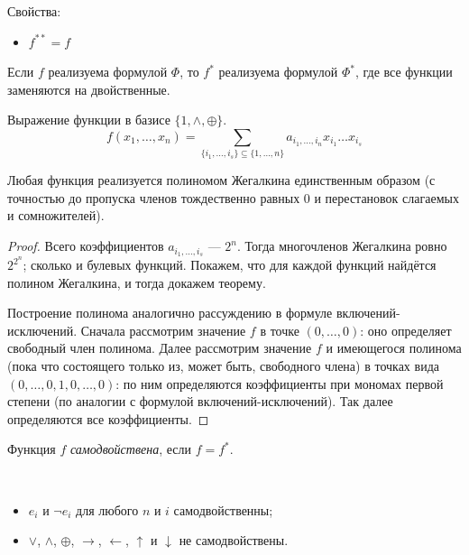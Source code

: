 \documentclass[12pt,a4paper]{article}
\begin{document}
    Свойства:
    \begin{itemize}
        \item $f^{**} = f$
    \end{itemize}

    \begin{statement}
        Если $f$ реализуема формулой $\Phi$, то $f^*$ реализуема формулой $\Phi^*$, где все функции заменяются на двойственные.
    \end{statement}

    \begin{definition}
        Выражение функции в базисе $\{1, \wedge, \oplus\}$.
        \[
            f(x_1, \dots, x_n) = \sum_{\{i_1, \dots, i_s\}\subseteq\{1, \dots, n\}} a_{i_1, \dots, i_n} x_{i_1} \dots x_{i_s}
        \]
    \end{definition}

    \begin{theorem}[Жегалкин]
        Любая функция реализуется полиномом Жегалкина единственным образом (с точностью до пропуска членов тождественно равных 0 и перестановок слагаемых и сомножителей). 
    \end{theorem}

    \begin{proof}
        Всего коэффициентов $a_{i_1, \dots, i_s}$ --- $2^n$. Тогда многочленов Жегалкина ровно $2^{2^n}$; сколько и булевых функций. Покажем, что для каждой функций найдётся полином Жегалкина, и тогда докажем теорему.

        Построение полинома аналогично рассуждению в формуле включений-исключений. Сначала рассмотрим значение $f$ в точке $(0, \dots, 0)$: оно определяет свободный член полинома. Далее рассмотрим значение $f$ и имеющегося полинома (пока что состоящего только из, может быть, свободного члена) в точках вида $(0, \dots, 0, 1, 0, \dots, 0)$: по ним определяются коэффициенты при мономах первой степени (по аналогии с формулой включений-исключений). Так далее определяются все коэффициенты.
    \end{proof}

    \begin{definition}
        Функция $f$ \emph{самодвойствена}, если $f=f^*$.
    \end{definition}

    \begin{example}\ 
        \begin{itemize}
            \item $e_i$ и $\neg e_i$ для любого $n$ и $i$ самодвойственны;
            \item $\vee$, $\wedge$, $\oplus$, $\rightarrow$, $\leftarrow$, $\uparrow$ и $\downarrow$ не самодвойствены.
        \end{itemize}
    \end{example}
\end{document}

